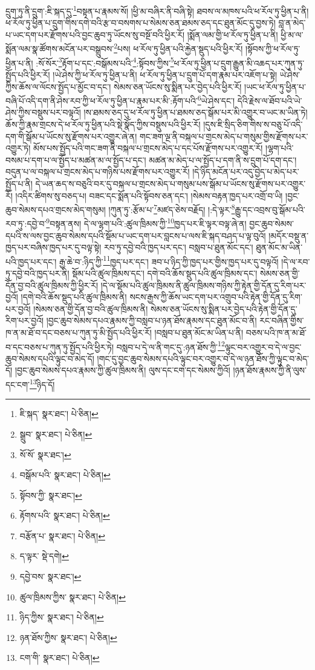 དྲུག་ཏུ་ནི་དྲུག་:ཇི་སྐད་དུ་\footnote{ཇི་སྐད་  སྣར་ཐང་།  པེ་ཅིན། }བསྟན་པ་རྣམས་སོ། །ཕྱི་མ་བཞིར་ནི་བཞི་སྟེ། ཐབས་ལ་མཁས་པའི་ཕ་རོལ་ཏུ་ཕྱིན་པ་ནི། ཕ་རོལ་ཏུ་ཕྱིན་པ་དྲུག་གིས་དགེ་བའི་རྩ་བ་བསགས་པ་སེམས་ཅན་ཐམས་ཅད་དང་ཐུན་མོང་དུ་བྱས་ཏེ། བླ་ན་མེད་པ་ཡང་དག་པར་རྫོགས་པའི་བྱང་ཆུབ་ཏུ་ཡོངས་སུ་བསྔོ་བའི་ཕྱིར་རོ། །སྨོན་ལམ་གྱི་ཕ་རོལ་ཏུ་ཕྱིན་པ་ནི། ཕྱི་མ་ལ་སྨོན་ལམ་སྣ་ཚོགས་མངོན་པར་བསྒྲུབས་\footnote{སྒྲུབ་  སྣར་ཐང་།  པེ་ཅིན། }པས། ཕ་རོལ་ཏུ་ཕྱིན་པའི་རྐྱེན་སྡུད་པའི་ཕྱིར་རོ། །སྟོབས་ཀྱི་ཕ་རོལ་ཏུ་ཕྱིན་པ་ནི། :སོ་སོར་\footnote{སོ་སོ་  སྣར་ཐང་། }རྟོག་པ་དང་:བསྒོམས་པའི་\footnote{བསྒོམ་པའི་  སྣར་ཐང་།  པེ་ཅིན། }:སྟོབས་ཀྱིས་\footnote{སྟོབས་ཀྱི་  སྣར་ཐང་། }ཕ་རོལ་ཏུ་ཕྱིན་པ་དྲུག་རྒྱུན་མི་འཆད་པར་ཀུན་ཏུ་སྤྱོད་པའི་ཕྱིར་རོ། །ཡེ་ཤེས་ཀྱི་ཕ་རོལ་ཏུ་ཕྱིན་པ་ནི། ཕ་རོལ་ཏུ་ཕྱིན་པ་དྲུག་པོ་དག་རྣམ་པར་འཇོག་པ་སྟེ། ཡེ་ཤེས་ཀྱིས་ཆོས་ལ་ལོངས་སྤྱོད་པ་མྱོང་བ་དང་། སེམས་ཅན་ཡོངས་སུ་སྨིན་པར་བྱེད་པའི་ཕྱིར་རོ། །ཡང་ཕ་རོལ་ཏུ་ཕྱིན་པ་བཞི་པོ་འདི་དག་ནི་ཤེས་རབ་ཀྱི་ཕ་རོལ་ཏུ་ཕྱིན་པ་རྣམ་པར་མི་:རྟོག་པའི་\footnote{རྟོགས་པའི་  སྣར་ཐང་།  པེ་ཅིན། }ཡེ་ཤེས་དང་། དེའི་རྗེས་ལ་ཐོབ་པའི་ཡེ་ཤེས་ཀྱིས་བསྡུས་པར་བལྟའོ། །ས་ཐམས་ཅད་དུ་ཕ་རོལ་ཏུ་ཕྱིན་པ་ཐམས་ཅད་སྒོམ་པར་མི་འགྱུར་བ་ཡང་མ་ཡིན་ཏེ། ཆོས་ཀྱི་རྣམ་གྲངས་དེ་ཕ་རོལ་ཏུ་ཕྱིན་པའི་སྡེ་སྣོད་ཀྱིས་བསྡུས་པའི་ཕྱིར་རོ། །དུས་ཇི་སྲིད་ཅིག་གིས་ས་བཅུ་པོ་འདི་དག་གི་སྒོམ་པ་ཡོངས་སུ་རྫོགས་པར་འགྱུར་ཞེ་ན། གང་ཟག་ལྔ་ནི་བསྐལ་པ་གྲངས་མེད་པ་གསུམ་གྱིས་རྫོགས་པར་འགྱུར་ཏེ། མོས་པས་སྤྱོད་པའི་གང་ཟག་ནི་བསྐལ་པ་གྲངས་མེད་པ་དང་པོས་རྫོགས་པར་འགྱུར་རོ། །ལྷག་པའི་བསམ་པ་དག་པ་ལ་སྤྱོད་པ་མཚན་མ་ལ་སྤྱོད་པ་དང་། མཚན་མ་མེད་པ་ལ་སྤྱོད་པ་དག་ནི་ས་དྲུག་པོ་དག་དང་། བདུན་པ་ལ་བསྐལ་པ་གྲངས་མེད་པ་གཉིས་པས་རྫོགས་པར་འགྱུར་རོ། །དེ་ཉིད་མངོན་པར་འདུ་བྱེད་པ་མེད་པར་སྤྱོད་པ་ནི། དེ་ཡན་ཆད་ས་བཅུའི་བར་དུ་བསྐལ་པ་གྲངས་མེད་པ་གསུམ་པས་སྒོམ་པ་ཡོངས་སུ་རྫོགས་པར་འགྱུར་རོ། །འདིར་ཚིགས་སུ་བཅད་པ། བཟང་དང་སྨོན་པའི་སྟོབས་ཅན་དང་། །སེམས་བརྟན་ཁྱད་པར་འགྲོ་བ་ཡི། །བྱང་ཆུབ་སེམས་དཔའ་གྲངས་མེད་གསུམ། །ཀུན་ཏུ་:རྩོམ་པ་\footnote{བརྩོན་པ་  སྣར་ཐང་།  པེ་ཅིན། }མཛད་ཅེས་བརྗོད། །:དེ་ལྟར་\footnote{ད་ལྟར་  སྡེ་དགེ། }རྒྱུ་དང་འབྲས་བུ་སྒོམ་པའི་རབ་ཏུ་:དབྱེ་བ་\footnote{དབྱེ་བས་  སྣར་ཐང་། }བསྟན་ནས། དེ་ལ་ལྷག་པའི་:ཚུལ་ཁྲིམས་ཀྱི་\footnote{ཚུལ་ཁྲིམས་ཀྱིས་  སྣར་ཐང་།  པེ་ཅིན། }ཁྱད་པར་ཇི་ལྟར་བལྟ་ཞེ་ན། བྱང་ཆུབ་སེམས་དཔའི་ས་ལས་བྱང་ཆུབ་སེམས་དཔའི་སྡོམ་པ་ཡང་དག་པར་བླངས་པ་ལས་ཇི་སྐད་བཤད་པ་ལྟ་བུའོ། །མདོར་བསྡུ་ན་ཁྱད་པར་བཞིས་ཁྱད་པར་དུ་བལྟ་སྟེ། རབ་ཏུ་དབྱེ་བའི་ཁྱད་པར་དང་། བསླབ་པ་ཐུན་མོང་དང་། ཐུན་མོང་མ་ཡིན་པའི་ཁྱད་པར་དང་། རྒྱ་ཆེ་བ་:ཉིད་ཀྱི་\footnote{ཉིད་ཀྱིས་  སྣར་ཐང་།  པེ་ཅིན། }ཁྱད་པར་དང་། ཟབ་པ་ཉིད་ཀྱི་ཁྱད་པར་གྱིས་ཁྱད་པར་དུ་བལྟའོ། །དེ་ལ་རབ་ཏུ་དབྱེ་བའི་ཁྱད་པར་ནི། སྡོམ་པའི་ཚུལ་ཁྲིམས་དང་། དགེ་བའི་ཆོས་སྡུད་པའི་ཚུལ་ཁྲིམས་དང་། སེམས་ཅན་གྱི་དོན་བྱ་བའི་ཚུལ་ཁྲིམས་ཀྱི་ཕྱིར་རོ། །དེ་ལ་སྡོམ་པའི་ཚུལ་ཁྲིམས་ནི་ཚུལ་ཁྲིམས་གཉིས་ཀྱི་རྟེན་གྱི་དོན་དུ་རིག་པར་བྱའོ། །དགེ་བའི་ཆོས་སྡུད་པའི་ཚུལ་ཁྲིམས་ནི། སངས་རྒྱས་ཀྱི་ཆོས་ཡང་དག་པར་འགྲུབ་པའི་རྟེན་གྱི་དོན་དུ་རིག་པར་བྱའོ། །སེམས་ཅན་གྱི་དོན་བྱ་བའི་ཚུལ་ཁྲིམས་ནི། སེམས་ཅན་ཡོངས་སུ་སྨིན་པར་བྱེད་པའི་རྟེན་གྱི་དོན་དུ་རིག་པར་བྱའོ། །བྱང་ཆུབ་སེམས་དཔའ་རྣམས་ཀྱི་བསླབ་པ་ཉན་ཐོས་རྣམས་དང་ཐུན་མོང་བ་ནི། རང་བཞིན་གྱིས་ཁ་ན་མ་ཐོ་བ་དང་བཅས་པ་ཀུན་ཏུ་མི་སྤྱོད་པའི་ཕྱིར་རོ། །བསླབ་པ་ཐུན་མོང་མ་ཡིན་པ་ནི། བཅས་པའི་ཁ་ན་མ་ཐོ་བ་དང་བཅས་པ་ཀུན་ཏུ་སྤྱོད་པའི་ཕྱིར་ཏེ། བསླབ་པ་དེ་ལ་ནི་གང་དུ་:ཉན་ཐོས་ཀྱི་\footnote{ཉན་ཐོས་ཀྱིས་  སྣར་ཐང་།  པེ་ཅིན། }ལྟུང་བར་འགྱུར་བ་དེ་ལ་བྱང་ཆུབ་སེམས་དཔའི་ལྟུང་བ་མེད་དོ། །གང་དུ་བྱང་ཆུབ་སེམས་དཔའི་ལྟུང་བར་འགྱུར་བ་དེ་ལ་ཉན་ཐོས་ཀྱི་ལྟུང་བ་མེད་དོ། །བྱང་ཆུབ་སེམས་དཔའ་རྣམས་ཀྱི་ཚུལ་ཁྲིམས་ནི། ལུས་དང་ངག་དང་སེམས་ཀྱིའོ། །ཉན་ཐོས་རྣམས་ཀྱི་ནི་ལུས་དང་ངག་\footnote{ངག་གི་  སྣར་ཐང་།  པེ་ཅིན། }ཉིད་དོ། 